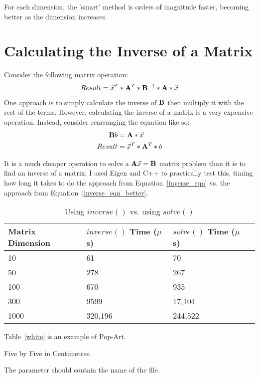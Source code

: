 \documentclass[report,12pt,notitlepage,onecolumn]{article}
\begin{document}
For each dimension, the 'smart' method is orders of magnitude faster, becoming better as the dimension increases.

\section{Calculating the Inverse of a Matrix}

Consider the following matrix operation:
\begin{equation}\label{inverse_eqn}
Result = \vec{x}^{T} * \mathbf{A}^{T} * \mathbf{B}^{-1} * \mathbf{A} * \vec{x}
\end{equation}

One approach is to simply calculate the inverse of $\mathbf{B}$ then multiply it with the rest of the terms. However, calculating the inverse of a matrix is a very expensive operation. Instead, consider rearranging the equation like so:
\begin{equation}
\begin{split}\label{inverse_eqn_better}
\mathbf{B}b &=  \mathbf{A} * \vec{x} \\
Result &= \vec{x}^{T} * \mathbf{A}^{T} * b
\end{split}
\end{equation}

It is a much cheaper operation to solve a $\mathbf{A}\vec{x} = \mathbf{B}$ matrix problem than it is to find an inverse of a matrix. I used Eigen and C++ to practically test this, timing how long it takes to do the approach from Equation~\ref{inverse_eqn} vs. the approach from Equation~\ref{inverse_eqn_better}.

\begin{table}[!h]
	\begin{tabular}{| l | l | l | l |}
		\hline
		Matrix Dimension & $inverse()$ Time ($\mu$s) & $solve()$ Time ($\mu$s) \\ \hline
		10 & 61 & 70 \\ \hline
		50 & 278 & 267  \\ \hline
		100 & 670 & 935  \\ \hline
		300 & 9599 & 17,104  \\ \hline
		1000 & 320,196 & 244,522 \\
		\hline
	\end{tabular}
	\caption{Using $inverse()$ vs. using $solve()$\label{data_inverse}}
\end{table}



Table~\ref{white} is an example of Pop-Art.
\begin{table}[!hbtp]
\makebox[\textwidth]{\framebox[5cm]{\rule{0pt}{5cm}}}
\caption[summary]{Five by Five in Centimetres.\label{white}}
\end{table}

The parameter
 should
contain the name of the file.
\end{document}

